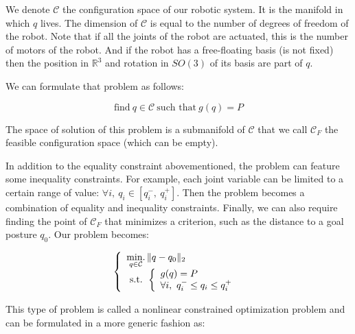 We denote $\mathcal{C}$ the configuration space of our robotic system.
It is the manifold in which $q$ lives. The dimension of $\mathcal{C}$ is equal to the number of degrees of freedom of the robot.
Note that if all the joints of the robot are actuated, this is the number of motors of the robot.
And if the robot has a free-floating basis (is not fixed) then the position in $\mathbb{R}^3$ and rotation in $SO(3)$ of its basis are part of $q$.

We can formulate that problem as follows:

\begin{equation}
  \text{find}\ q\in\mathcal{C}\ \text{such that}\ g(q)=P
\end{equation}

The space of solution of this problem is a submanifold of $\mathcal{C}$ that we call ${\mathcal{C}}_F$ the feasible configuration space (which can be empty).

In addition to the equality constraint abovementioned, the problem can feature some inequality constraints.
For example, each joint variable can be limited to a certain range of value: $\forall i,\ q_i\in [q_i^-,\ q_i^+]$.
Then the problem becomes a combination of equality and inequality constraints.%
Finally, we can also require finding the point of $\mathcal{C}_F$ that minimizes a criterion, such as the distance to a goal posture $q_0$.
Our problem becomes:

\begin{equation}
  \left\{
  \begin{array}{l}
    \operatorname*{min.}\limits_{q\in\mathcal{C}}{\|q-q_0\|_2}\\
    \text{ s.t. }
    \left\{
    \begin{array}{l}
      g(q)=P\\
      \forall i,\ q_i^- \leq q_i \leq q_i^+
    \end{array}
    \right.
  \end{array}
  \right.
\end{equation}

This type of problem is called a nonlinear constrained optimization problem and can be formulated in a more generic fashion as:

